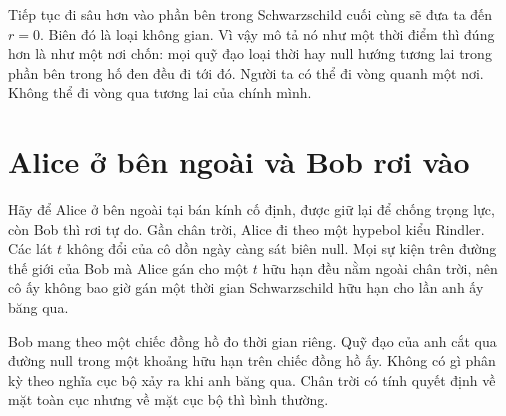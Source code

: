 Tiếp tục đi sâu hơn vào phần bên trong Schwarzschild cuối cùng sẽ đưa ta đến \(r=0\). Biên đó là loại không gian. Vì vậy mô tả nó như một thời điểm thì đúng hơn là như một nơi chốn: mọi quỹ đạo loại thời hay null hướng tương lai trong phần bên trong hố đen đều đi tới đó. Người ta có thể đi vòng quanh một nơi. Không thể đi vòng qua tương lai của chính mình.

\begin{classroomqa}
\end{classroomqa}

\begin{classroomqa}
\end{classroomqa}

\section{Alice ở bên ngoài và Bob rơi vào}

Hãy để Alice ở bên ngoài tại bán kính cố định, được giữ lại để chống trọng lực, còn Bob thì rơi tự do. Gần chân trời, Alice đi theo một hypebol kiểu Rindler. Các lát \(t\) không đổi của cô dồn ngày càng sát biên null. Mọi sự kiện trên đường thế giới của Bob mà Alice gán cho một \(t\) hữu hạn đều nằm ngoài chân trời, nên cô ấy không bao giờ gán một thời gian Schwarzschild hữu hạn cho lần anh ấy băng qua.

Bob mang theo một chiếc đồng hồ đo thời gian riêng. Quỹ đạo của anh cắt qua đường null trong một khoảng hữu hạn trên chiếc đồng hồ ấy. Không có gì phân kỳ theo nghĩa cục bộ xảy ra khi anh băng qua. Chân trời có tính quyết định về mặt toàn cục nhưng về mặt cục bộ thì bình thường.

